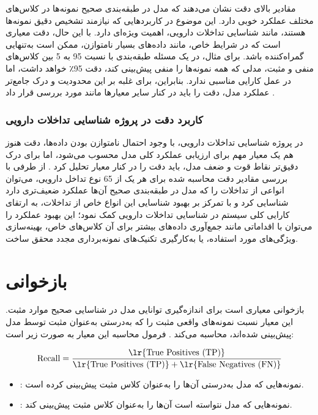 مقادیر بالای دقت نشان می‌دهند که مدل در طبقه‌بندی صحیح نمونه‌ها در کلاس‌های مختلف عملکرد خوبی دارد. این موضوع در کاربردهایی که نیازمند تشخیص دقیق نمونه‌ها هستند، مانند شناسایی تداخلات دارویی، اهمیت ویژه‌ای دارد. با این حال، دقت معیاری است که در شرایط خاص، مانند داده‌های بسیار نامتوازن، ممکن است به‌تنهایی گمراه‌کننده باشد. برای مثال، در یک مسئله طبقه‌بندی با نسبت 95 به 5 بین کلاس‌های منفی و مثبت، مدلی که همه نمونه‌ها را منفی پیش‌بینی کند، دقت 95٪ خواهد داشت، اما در عمل کارایی مناسبی ندارد. بنابراین، برای غلبه بر این محدودیت و درک جامع‌تر عملکرد مدل، دقت را باید در کنار سایر معیارها مانند  مورد بررسی قرار داد \cite{ref_sokolova2009, ref_powers2011}.

\subsubsection{کاربرد دقت در پروژه شناسایی تداخلات دارویی}
در پروژه شناسایی تداخلات دارویی، با وجود احتمال نامتوازن بودن داده‌ها، دقت هنوز هم یک معیار مهم برای ارزیابی عملکرد کلی مدل محسوب می‌شود، اما برای درک دقیق‌تر نقاط قوت و ضعف مدل، باید دقت را در کنار معیار  تحلیل کرد \cite{ref_sokolova2009}. از طرفی با بررسی مقادیر دقت محاسبه شده برای هر یک از 65 نوع تداخل دارویی، می‌توان انواعی از تداخلات را که مدل در طبقه‌بندی صحیح آن‌ها عملکرد ضعیف‌تری دارد شناسایی کرد و با تمرکز بر بهبود شناسایی این انواع خاص از تداخلات، به ارتقای کارایی کلی سیستم در شناسایی تداخلات دارویی کمک نمود؛ این بهبود عملکرد را می‌توان با اقداماتی مانند جمع‌آوری داده‌های بیشتر برای آن کلاس‌های خاص، بهینه‌سازی ویژگی‌های مورد استفاده، یا به‌کارگیری تکنیک‌های نمونه‌برداری مجدد محقق ساخت.

\section{بازخوانی}

بازخوانی معیاری است برای اندازه‌گیری توانایی مدل در شناسایی صحیح موارد مثبت. این معیار نسبت نمونه‌های واقعی مثبت را که به‌درستی به‌عنوان مثبت توسط مدل پیش‌بینی شده‌اند، محاسبه می‌کند \cite{ref_powers2011}. فرمول محاسبه این معیار به صورت زیر است:

\begin{equation}
	\text{Recall} = \frac{\text{\lr{True Positives (TP)}}}{\text{\lr{True Positives (TP)}} + \text{\lr{False Negatives (FN)}}}
\end{equation}

\begin{itemize}
	\item \textbf{}: نمونه‌هایی که مدل به‌درستی آن‌ها را به‌عنوان کلاس مثبت پیش‌بینی کرده است.
	\item \textbf{}: نمونه‌هایی که مدل نتواسته است آن‌ها را به‌عنوان کلاس مثبت پیش‌بینی کند.
\end{itemize}

